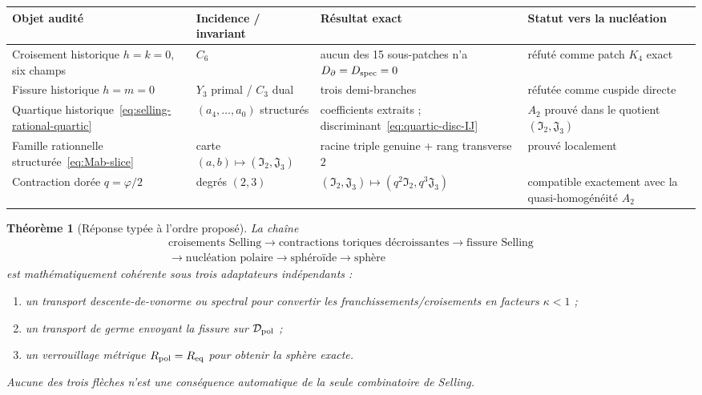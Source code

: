 \documentclass[11pt,a4paper]{article}
\newtheorem{theorem}{Théorème}[section]
\newcommand{\ph}{\varphi}
\begin{document}
\begin{center}
\small
\begin{tabularx}{\textwidth}{@{}>{\raggedright\arraybackslash}X >{\raggedright\arraybackslash}X >{\raggedright\arraybackslash}X >{\raggedright\arraybackslash}X@{}}
\toprule
Objet audité & Incidence / invariant & Résultat exact & Statut vers la nucléation\\
\midrule
Croisement historique $h=k=0$, six champs & $C_6$ & aucun des 15 sous-patches n'a $D_\partial=D_{\rm spec}=0$ & réfuté comme patch $K_4$ exact\\
Fissure historique $h=m=0$ & $Y_3$ primal / $C_3$ dual & trois demi-branches & réfutée comme cuspide directe\\
Quartique historique~\eqref{eq:selling-rational-quartic} & $(a_4,\ldots,a_0)$ structurés & coefficients extraits ; discriminant~\eqref{eq:quartic-disc-IJ} & $A_2$ prouvé dans le quotient $(\mathfrak I_2,\mathfrak J_3)$\\
Famille rationnelle structurée~\eqref{eq:Mab-slice} & carte $(a,b)\mapsto(\mathfrak I_2,\mathfrak J_3)$ & racine triple genuine + rang transverse $2$ & prouvé localement\\
Contraction dorée $q=\ph/2$ & degrés $(2,3)$ & $(\mathfrak I_2,\mathfrak J_3)\mapsto(q^2\mathfrak I_2,q^3\mathfrak J_3)$ & compatible exactement avec la quasi-homogénéité $A_2$\\
\bottomrule
\end{tabularx}
\end{center}

\begin{theorem}[Réponse typée à l'ordre proposé]\label{thm:selling-order}
La chaîne
\[
 \boxed{\begin{gathered}
 \text{croisements Selling}
 \longrightarrow
 \text{contractions toriques décroissantes}
 \longrightarrow
 \text{fissure Selling}
 \\
 \longrightarrow
 \text{nucléation polaire}
 \longrightarrow
 \text{sphéroïde}
 \longrightarrow
 \text{sphère}
 \end{gathered}}
\]
est mathématiquement cohérente sous trois adaptateurs indépendants :
\begin{enumerate}[label=\textup{(\roman*)}]
\item un transport descente-de-vonorme ou spectral pour convertir les franchissements/croisements en facteurs $\kappa<1$ ;
\item un transport de germe envoyant la fissure sur $\mathcal D_{\rm pol}$ ;
\item un verrouillage métrique $R_{\rm pol}=R_{\rm eq}$ pour obtenir la sphère exacte.
\end{enumerate}
Aucune des trois flèches n'est une conséquence automatique de la seule combinatoire de Selling.
\end{theorem}
\end{document}
